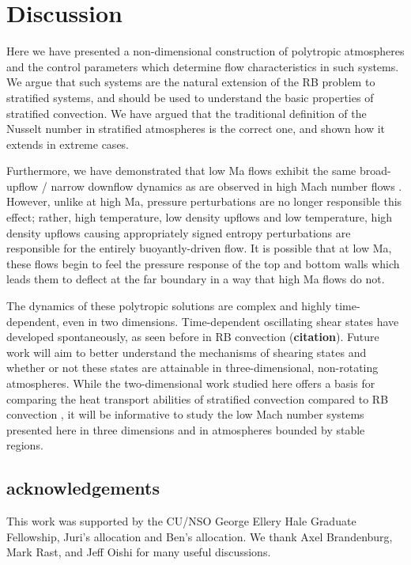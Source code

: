 \documentclass[aps, prl, twocolumn, groupedaddress, amsfonts, amssymb, amsmath]{revtex4-1}
\begin{document}
\section{Discussion}
\label{sec:discussion}
Here we have presented a non-dimensional construction of polytropic atmospheres and the control parameters 
which determine flow characteristics in such systems.  We argue that such systems are the natural extension
of the RB problem to stratified systems, and should be used to understand the basic properties of stratified
convection.  We have argued that the traditional definition of the Nusselt number in stratified atmospheres
\cite{graham1975} is the correct one, and shown how it extends in extreme cases.

Furthermore, we have demonstrated that low Ma flows exhibit the same broad-upflow / narrow downflow dynamics
as are observed in high Mach number flows \cite{hurlburt&all1984}.  However, unlike at high Ma, pressure perturbations
are no longer responsible this effect; rather, high temperature, low density upflows and low temperature,
high density upflows causing appropriately signed entropy perturbations are responsible for the entirely
buoyantly-driven flow.  It is possible that at low Ma, these flows begin to feel the pressure response of the
top and bottom walls which leads them to deflect at the far boundary in a way that high Ma flows do not.

The dynamics of these polytropic solutions are complex and highly time-dependent, even in two dimensions.
Time-dependent oscillating shear states have developed spontaneously, as seen before in RB convection
(\textbf{citation}).  Future work will aim to better understand the mechanisms of shearing states and
whether or not these states are attainable in three-dimensional, non-rotating atmospheres.  While the
two-dimensional work studied here offers a basis for comparing the heat transport abilities of stratified
convection compared to RB convection \cite{johnston&doering2009}, it will be informative to study the low 
Mach number systems presented here in three dimensions and in atmospheres bounded by stable regions.


\subsection{acknowledgements}
This work was supported by the CU/NSO George Ellery Hale Graduate Fellowship,
Juri's allocation and Ben's allocation.
We thank Axel Brandenburg, Mark Rast, and Jeff Oishi for many useful discussions.


\end{document}
